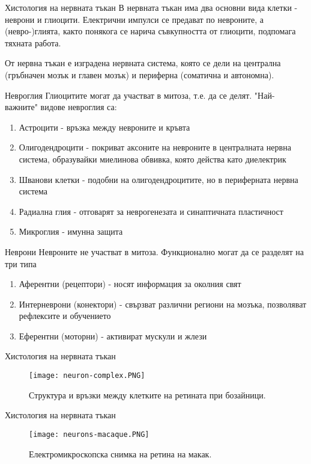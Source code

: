 \begin{frame}[t]{Хистология на нервната тъкан}
    В нервната тъкан има два основни вида клетки - неврони и глиоцити.
    Електрични импулси се предават по невроните, а (невро-)глията, 
    както понякога се нарича съвкупността от глиоцити, подпомага тяхната работа.

    От нервна тъкан е изградена нервната система, която се дели на централна (гръбначен мозък и главен мозък) и периферна (соматична и автономна).
\end{frame}

\begin{frame}[t]{Невроглия}
    Глиоцитите могат да участват в митоза, т.е. да се делят. "Най-важните" видове невроглия са:
    \begin{enumerate}
        \item Астроцити - връзка между невроните и кръвта
        \item Олигодендроцити - покриват аксоните на невроните в централната нервна система, образувайки миелинова обвивка, която действа като диелектрик
        \item Шванови клетки - подобни на олигодендроцитите, но в периферната нервна система
        \item Радиална глия - отговарят за неврогенезата и синаптичната пластичност
        \item Микроглия - имунна защита
    \end{enumerate}
\end{frame}

\begin{frame}[t]{Неврони}
    Невроните не участват в митоза. Функционално могат да се разделят на три типа
    \begin{enumerate}
        \item Аферентни (рецептори) - носят информация за околния свят 
        \item Интерневрони (конектори) - свързват различни региони на мозъка, позволяват рефлексите и обучението 
        \item Еферентни (моторни) - активират мускули и жлези
    \end{enumerate}
\end{frame}

\begin{frame}[t]{Хистология на нервната тъкан}
    \begin{figure}[htbp!]
      \centering
      \texttt{[image: neuron-complex.PNG]}
      \caption{Структура и връзки между клетките на ретината при бозайници. \cite[Фиг 1.2]{Neuron}}
    \end{figure}
\end{frame}

\begin{frame}[t]{Хистология на нервната тъкан}
    \begin{figure}[htbp!]
      \centering
      \texttt{[image: neurons-macaque.PNG]}
      \caption{Електромикроскопска снимка на ретина на макак. \cite[Фиг 1.3]{Neuron}}
    \end{figure}
\end{frame}

